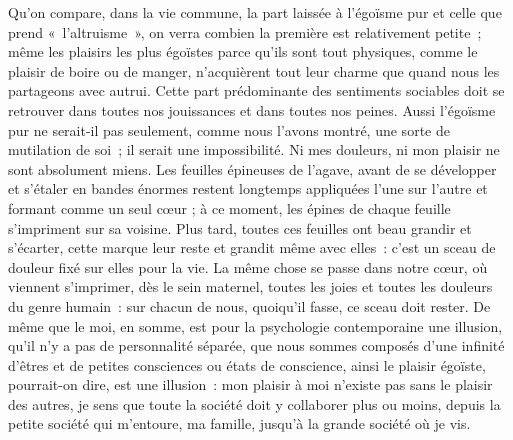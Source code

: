 {Qu'on compare, dans la vie
commune, la part laissée à l'égoïsme pur et celle que prend
«~l'altruisme~», on verra combien la première est relativement petite~;
même les plaisirs les plus égoïstes parce qu'ils sont tout
physiques, comme le plaisir de boire ou de manger, n'acquièrent tout
leur charme que quand nous les partageons avec autrui. Cette part
prédominante des sentiments sociables doit se retrouver dans toutes
nos jouissances et dans toutes nos peines. Aussi l'égoïsme pur ne
serait-il pas seulement, comme nous l'avons montré, une sorte de
mutilation de soi~; il serait une impossibilité. Ni mes douleurs, ni
mon plaisir ne sont absolument miens. Les feuilles épineuses de
l'agave, avant de se développer et s'étaler en bandes énormes restent
longtemps appliquées l'une sur l'autre et formant comme un seul cœur
; à ce moment, les épines de chaque feuille s'impriment sur sa
voisine. Plus tard, toutes ces feuilles ont beau grandir et
s'écarter, cette marque leur reste et grandit même avec elles~: c'est
un sceau de douleur fixé sur elles pour la vie. La même chose se
passe dans notre cœur, où viennent s'imprimer, dès le sein maternel,
toutes les joies et toutes les douleurs du genre humain~: sur chacun
de nous, quoiqu'il fasse, ce sceau doit rester. De même que le moi,
en somme, est pour la psychologie contemporaine une illusion, qu'il
n'y a pas de personnalité séparée, que nous sommes composés d'une
infinité d'êtres et de petites consciences ou états de conscience,
ainsi le plaisir égoïste, pourrait-on dire, est une illusion~: mon
plaisir à moi n'existe pas sans le plaisir des autres, je sens que
toute la société doit y collaborer plus ou moins, depuis la petite
société qui m'entoure, ma famille, jusqu'à la grande société où je
vis.
}

